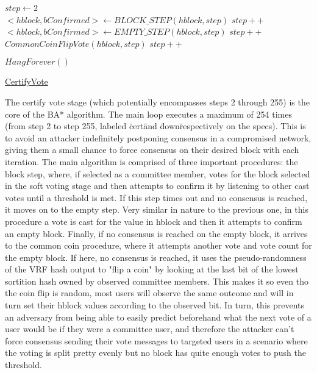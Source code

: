 \documentclass[10pt,a4paper]{article}
\begin{document}
\begin{algorithm}
    \begin{algorithmic}[1]

    \State $step \gets 2$
    {
        \\
        \State $<hblock, bConfirmed> \gets BLOCK\_STEP(hblock, step)$
        \EndIf
        \State $step++$\\
   
        \State $<hblock, bConfirmed> \gets EMPTY\_STEP(hblock,step)$
        \EndIf
        \State $step++$\\

        \State $CommonCoinFlipVote(hblock, step)$
        \State $step++$
    }
    \EndWhile

    \State $HangForever()$
    
    \EndFunction
    \end{algorithmic}
    \caption{\underline{CertifyVote}}
\end{algorithm}

The certify vote stage (which potentially encompasses steps 2 through 255) is the core of the BA* algorithm.
The main loop executes a maximum of 254 times (from step 2 to step 255, labeled \"cert\" and \"down\" respectively on the specs).
This is to avoid an attacker indefinitely postponing consensus in a compromised network, giving them a small chance to force consensus on their desired block with each iteration.
The main algorithm is comprised of three important procedures: the block step, where, if selected as a committee member, votes for the block selected in the soft voting stage and then attempts to confirm it by listening to other cast votes until a threshold is met.
If this step times out and no consensus is reached, it moves on to the empty step. Very similar in nature to the previous one, in this procedure a vote is cast for the value in hblock and then it attempts to confirm an empty block.
Finally, if no consensus is reached on the empty block, it arrives to the common coin procedure, where it attempts another vote and vote count for the empty block. If here, no consensus is reached, it uses the pseudo-randomness of the VRF hash output to "flip a coin" by looking at the last bit of the lowest sortition hash owned by observed committee members.
This makes it so even tho the coin flip is random, most users will observe the same outcome and will in turn set their hblock values according to the observed bit. In turn, this prevents an adversary from being able to easily predict beforehand what the next vote of a user would be if they were a committee user, and therefore the attacker can't force consensus 
sending their vote messages to targeted users in a scenario where the voting is split pretty evenly but no block has quite enough votes to push the threshold.\\
\\
\\
\end{document}
